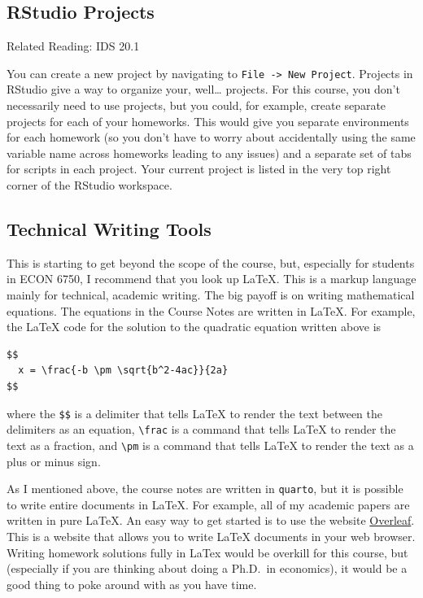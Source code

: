 \documentclass[
  letterpaper,
  DIV=11,
  numbers=noendperiod]{scrreprt}
\begin{document}
\subsection{RStudio Projects}\label{rstudio-projects}

Related Reading: IDS 20.1

You can create a new project by navigating to
\texttt{File\ -\textgreater{}\ New\ Project}. Projects in RStudio give a
way to organize your, well\ldots{} projects. For this course, you don't
necessarily need to use projects, but you could, for example, create
separate projects for each of your homeworks. This would give you
separate environments for each homework (so you don't have to worry
about accidentally using the same variable name across homeworks leading
to any issues) and a separate set of tabs for scripts in each project.
Your current project is listed in the very top right corner of the
RStudio workspace.

\subsection{Technical Writing Tools}\label{technical-writing-tools}

This is starting to get beyond the scope of the course, but, especially
for students in ECON 6750, I recommend that you look up LaTeX. This is a
markup language mainly for technical, academic writing. The big payoff
is on writing mathematical equations. The equations in the Course Notes
are written in LaTeX. For example, the LaTeX code for the solution to
the quadratic equation written above is

\begin{verbatim}
$$
  x = \frac{-b \pm \sqrt{b^2-4ac}}{2a}
$$
\end{verbatim}

where the \texttt{\$\$} is a delimiter that tells LaTeX to render the
text between the delimiters as an equation,
\texttt{\textbackslash{}frac} is a command that tells LaTeX to render
the text as a fraction, and \texttt{\textbackslash{}pm} is a command
that tells LaTeX to render the text as a plus or minus sign.

As I mentioned above, the course notes are written in \texttt{quarto},
but it is possible to write entire documents in LaTeX. For example, all
of my academic papers are written in pure LaTeX. An easy way to get
started is to use the website \href{http://www.overleaf.com}{Overleaf}.
This is a website that allows you to write LaTeX documents in your web
browser. Writing homework solutions fully in LaTex would be overkill for
this course, but (especially if you are thinking about doing a Ph.D.~in
economics), it would be a good thing to poke around with as you have
time.
\end{document}
